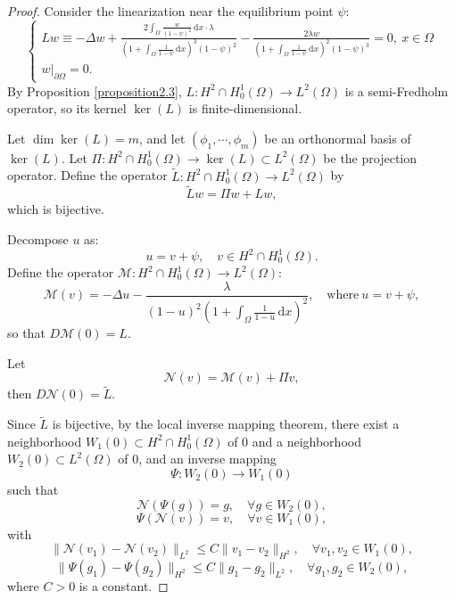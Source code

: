 \documentclass{article}
\numberwithin{equation}{section}
\begin{document}
\begin{proof}
    Consider the linearization near the equilibrium point $\psi$:
    \begin{equation}
        \begin{cases}
            Lw\equiv -\Delta w+\frac{2\int_{\Omega}\frac{w}{(1-\psi)^2}\,\mathrm{d}x\cdot\lambda}{(1+\int_{\Omega}\frac{1}{1-\psi}\,\mathrm{d}x)^3(1-\psi)^2}-\frac{2\lambda w}{(1+\int_{\Omega}\frac{1}{1-\psi}\,\mathrm{d}x)^2(1-\psi)^3}=0,\ x\in\Omega \\
            w |_{\partial\Omega}=0. \label{2.12}
        \end{cases}
    \end{equation}
    By Proposition \ref{proposition2.3}, $L:H^2\cap H_0^1(\Omega)\to L^{2}(\Omega)$ is a semi-Fredholm operator, so its kernel $\ker(L)$ is finite-dimensional.

    Let $\dim\ker (L)=m$, and let $(\phi_1,\cdots,\phi_m)$ be an orthonormal basis of $\ker(L)$. Let $\Pi:H^2\cap H_0^1(\Omega) \to \ker(L)\subset L^{2}(\Omega)$ be the projection operator. Define the operator $\tilde{L}:H^2\cap H_0^1(\Omega)\to L^{2}(\Omega)$ by
    $$\tilde{L}w=\Pi w+Lw,$$
    which is bijective.

    Decompose $u$ as:
    $$u=v+\psi,\quad v\in H^2\cap H_0^1(\Omega).$$
    Define the operator $\mathcal{M}:H^2\cap H_0^1(\Omega)\to L^{2}(\Omega)$:
    \begin{equation}
        \mathcal{M}(v)=-\Delta u-\frac{\lambda}{(1-u)^2(1+\int_{\Omega}\frac{1}{1-u}\,\mathrm{d}x)^2},\quad \text{where}\ u=v+\psi,\label{2.13}
    \end{equation}
    so that $D\mathcal{M}(0)=L$.

    Let
    \begin{equation}
        \mathcal{N}(v)=\mathcal{M}(v)+\Pi v,\label{2.14}
    \end{equation}
    then $D\mathcal{N}(0)=\tilde{L}$.

    Since $\tilde{L}$ is bijective, by the local inverse mapping theorem, there exist a neighborhood $W_1(0)\subset H^2\cap H_0^1(\Omega)$ of $0$ and a neighborhood $W_2(0)\subset L^{2}(\Omega)$ of $0$, and an inverse mapping
    $$\Psi:W_2(0)\to W_1(0)$$
    such that
    \begin{equation}
        \mathcal{N}(\Psi(g))=g,\quad \forall g\in W_2(0),\label{2.15}
    \end{equation}
    \begin{equation}
        \Psi(\mathcal{N}(v))=v,\quad \forall v\in W_1(0),\label{2.16}
    \end{equation}
    with
    \begin{equation}
        \|\mathcal{N}(v_1)-\mathcal{N}(v_2)\|_{L^{2}}\le C\|v_1-v_2\|_{H^2},\quad \forall v_1,v_2\in W_1(0),\label{2.17}
    \end{equation}
    \begin{equation}
        \|\Psi(g_1)-\Psi(g_2)\|_{H^2}\le C\|g_1-g_2\|_{L^{2}},\quad \forall g_1,g_2\in W_2(0),\label{2.18}
    \end{equation}
    where $C>0$ is a constant.


\end{proof}
\end{document}
